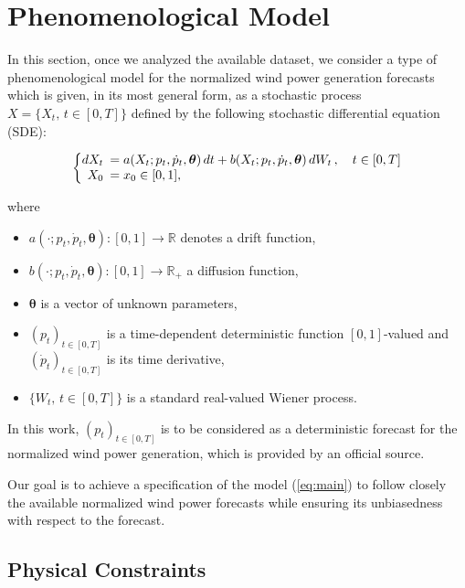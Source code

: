 \documentclass[11pt]{article}
\theoremstyle{definition}
\begin{document}
\section{Phenomenological  Model} \label{Section_2}

In this section, once we analyzed the available dataset, we consider a type of phenomenological model for the normalized wind power generation forecasts which is given, in its most general form, as a stochastic process $X = \{X_t, \, t \in [0,T] \}$  defined by the following stochastic differential equation (SDE):

\begin{equation}
  \left\{
  \begin{array}{@{}rl@{}}
    dX_t \!\!\!&=  a(X_t; p_t, \dot{p}_t,\bm{\theta}) \,dt + b (X_t; p_t, \dot{p}_t, \bm{\theta} ) \,dW_t\,, \quad t \in [0,T]  \\
     X_0  \!\!\!&=  x_0 \in [0,1],
  \end{array}\right. \label{eq:main}
\end{equation} 

where

\begin{itemize}
\item $a(\cdot; p_t, \dot{p}_t, \bm{\theta}): [0,1] \to \mathbb{R} $  denotes a drift function,
\item $b(\cdot; p_t, \dot{p}_t, \bm{\theta}): [0,1] \to \mathbb{R}_+ $  a  diffusion function,
\item $\bm{\theta}$ is a vector of unknown parameters,
\item $(p_t)_{t \in [0,T]}$ is a time-dependent deterministic function $[0,1]$-valued and $ (\dot{p}_t)_{t \in [0,T]}$ is its time derivative,
\item $\{W_t, \, t \in [0,T] \}$ is a standard real-valued Wiener process.
\end{itemize}

In this work, $(p_t)_{t \in [0,T]}$ is to be considered as a deterministic forecast for the normalized wind power generation, which is provided by an official source. 

Our goal is to achieve a specification of the model (\ref{eq:main}) to follow closely the available normalized wind power forecasts while ensuring its unbiasedness with respect to the forecast. 

\subsection{Physical Constraints} \label{Sec: Physical_Constraints}
\end{document}
